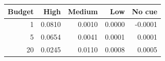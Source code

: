 \begin{tabular}{rrrrr}
\toprule
Budget & High & Medium & Low & No cue \\
\midrule
1 & 0.0810 & 0.0010 & 0.0000 & -0.0001 \\
5 & 0.0654 & 0.0041 & 0.0001 & 0.0001 \\
20 & 0.0245 & 0.0110 & 0.0008 & 0.0005 \\
\bottomrule
\end{tabular}
